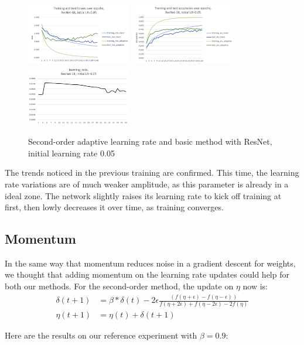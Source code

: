 \documentclass{article}
\begin{document}
  \begin{figure}[!h]
	\includegraphics[width=130pt]{loss_resnet_0_05.png}
	\includegraphics[width=130pt]{acc_resnet_0_05.png}
	\includegraphics[width=130pt]{lr_resnet_0_05.png}
	\caption{Second-order adaptive learning rate and basic method with ResNet, initial learning rate 0.05}
  \end{figure}
  
  The trends noticed in the previous training are confirmed. This time, the learning rate variations are of much weaker amplitude, as this parameter is already in a ideal zone. The network slightly raises its learning rate to kick off training at first, then lowly decreases it over time, as training converges. 
  
  \subsection{Momentum}
  
  In the same way that momentum reduces noise in a gradient descent for weights, we thought that adding momentum on the learning rate updates could help for both our methods. For the second-order method, the update on $\eta$ now is:\\
  \begin{align}
  \delta(t+1) &= \beta*\delta(t) - 2\epsilon\frac{(f(\eta+\epsilon)-f(\eta-\epsilon))}{f(\eta+2\epsilon)+f(\eta-2\epsilon)-2f(\eta)}\\
  \eta(t+1) &= \eta(t) + \delta(t+1)
  \end{align}
  
  Here are the results on our reference experiment with $\beta=0.9$:\\
  
\end{document}
